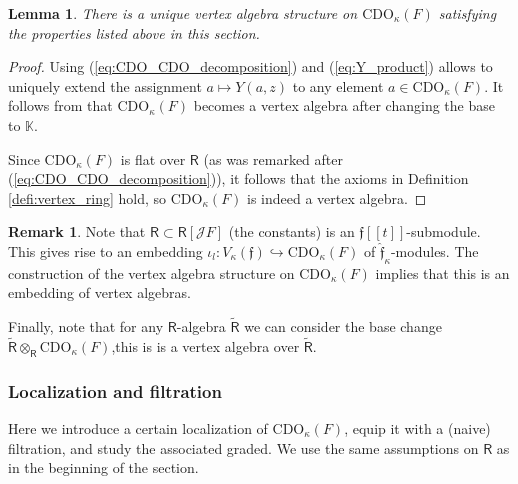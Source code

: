 \documentclass{amsart}
\newtheorem{Lem}[Thm]{Lemma}
\theoremstyle{definition}
\newtheorem{Rem}[Thm]{Remark}
\newcommand{\Ring}{\mathsf{R}}
\newcommand{\Jet}{\mathscr{J}}
\newcommand{\K}{\mathbb{K}}
\newcommand{\CDO}{\mathrm{CDO}}
\numberwithin{equation}{section}
\begin{document}
\begin{Lem}\label{Lem:CDO_vertex}
There is a unique vertex algebra structure on $\CDO_\kappa(F)$ satisfying the properties listed above in this section.
\end{Lem}
\begin{proof}
Using (\ref{eq:CDO_CDO_decomposition}) and (\ref{eq:Y_product}) allows to uniquely extend the assignment $a\mapsto Y(a,z)$ to any element $a\in \CDO_\kappa(F)$.  
It follows from \cite[Section 3.3]{Arkhipov_Gaitsgory} that $\CDO_\kappa(F)$ becomes a vertex algebra 
after changing the base to $\K$. 

Since $\CDO_\kappa(F)$ is flat over $\Ring$ (as was remarked after (\ref{eq:CDO_CDO_decomposition})), it follows that the axioms in Definition \ref{defi:vertex_ring} hold, so $\CDO_\kappa(F)$ is indeed a vertex algebra.
\end{proof}


\begin{Rem}\label{Rem:affine_CDO_embedding}
Note that $\Ring \subset \Ring[\Jet F]$ (the constants) is an $\mathfrak{f}[[t]]$-submodule. This gives rise to an embedding $\iota_l:V_\kappa(\mathfrak{f})\hookrightarrow \CDO_\kappa(F)$ of $\hat{\mathfrak{f}}_\kappa$-modules. The construction of the vertex algebra structure on $\CDO_\kappa(F)$ implies that this is an embedding of vertex algebras. 
\end{Rem}

Finally, note that for any $\Ring$-algebra $\tilde{\Ring}$ we can consider the base change $\tilde{\Ring}\otimes_\Ring\CDO_\kappa(F)$,this is is a vertex algebra over $\tilde{\Ring}$.

\subsubsection{Localization and filtration}\label{SSS_CDO_local_filtr}
Here we introduce a certain localization of $\CDO_\kappa(F)$, equip it with a (naive) filtration, and study the associated graded. We use the same assumptions on $\Ring$ as in the beginning of the section.
\end{document}
